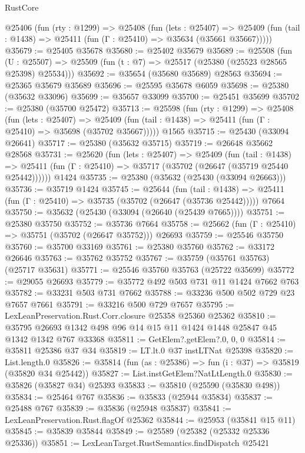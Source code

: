 \begin{lexlean}{RustCore}
\begin{coremodule}
  @25406
    (fun (rty : @1299) =>
    @25408
      (fun (lets : @25407) =>
      @25409 (fun (tail : @1438) => @25411 (fun (Γ : @25410) => @35634 (@35661 @35667)))))
@35679 := @25405 @35678
@35680 := @25402 @35679
@35689 := @25508
    (fun (U : @25507) => @25509 (fun (t : @7) => @25517 (@25380 (@25523 @28565 @25398) @25534)))
@35692 := @35654 (@35680 @35689) @28563
@35694 := @25365 @35679 @35689
@35696 := @25595 @35678 @6059
@35698 := @25380 (@35632 @33096)
@35699 := @35657 @33099
@35700 := @25451 @35699
@35702 := @25380 (@35700 @25472)
@35713 := @25598
    (fun (rty : @1299) =>
    @25408
      (fun (lets : @25407) =>
      @25409 (fun (tail : @1438) => @25411 (fun (Γ : @25410) => @35698 (@35702 @35667)))))
    @1565
@35715 := @25430 (@33094 @26641)
@35717 := @25380 (@35632 @35715)
@35719 := @26648 @35662 @28568
@35731 := @25620
    (fun (lets : @25407) =>
    @25409
      (fun (tail : @1438) =>
      @25411 (fun (Γ : @25410) => @35717 (@35702 (@26647 (@35719 @25440 @25442))))))
    @1424
@35735 := @25380 (@35632 (@25430 (@33094 @26663)))
@35736 := @35719 @1424
@35745 := @25644
    (fun (tail : @1438) => @25411 (fun (Γ : @25410) => @35735 (@35702 (@26647 (@35736 @25442)))))
    @7664
@35750 := @35632 (@25430 (@33094 (@26640 (@25439 @7665))))
@35751 := @25380 @35750
@35752 := @35736 @7664
@35758 := @25662 (fun (Γ : @25410) => @35751 (@35702 (@26647 @35752))) @26693
@35759 := @25546 @35750
@35760 := @35700 @33169
@35761 := @25380 @35760
@35762 := @33172 @26646
@35763 := @35762 @35752
@35767 := @35759 (@35761 @35763) (@25717 @35631)
@35771 := @25546 @35760 @35763 (@25722 @35699)
@35772 := @29055 @26693
@35779 := @35772 @492 @503 @731 @11 @1424 @7662 @763
@35782 := @33231 @503 @731 @7662
@35788 := @33236 @500 @502 @729 @23 @7657 @7661
@35791 := @33216 @500 @729 @7657
@35795 := LexLeanPreservation.Rust.Corr.closure @25358 @25360 @25362
@35810 := @35795 @26693 @1342 @498 @96 @14 @15 @11 @1424 @1448 @25847 @45 @1342 @1342 @767 @33368
@35811 := GetElem?.getElem?.{0, 0, 0}
@35814 := @35811 @25386 @37 @34
@35819 := LT.lt.{0} @37 instLTNat @25398
@35820 := List.length.{0}
@35826 := @35814 (fun (as : @25386) => fun (i : @37) => @35819 (@35820 @34 @25442))
@35827 := List.instGetElem?NatLtLength.{0}
@35830 := @35826 (@35827 @34) @25393
@35833 := @35810 (@25590 (@35830 @498))
@35834 := @25464 @767
@35836 := @35833 (@25944 @35834)
@35837 := @25488 @767
@35839 := @35836 (@25948 @35837)
@35841 := LexLeanPreservation.Rust.flagOf @25362
@35844 := @25953 (@35841 @15 @11)
@35845 := @35839 @35844
@35849 := @25589 (@25382 (@25332 @25336 @25336))
@35851 := LexLeanTarget.RustSemantics.findDispatch @25421

\end{coremodule}
\end{lexlean}
